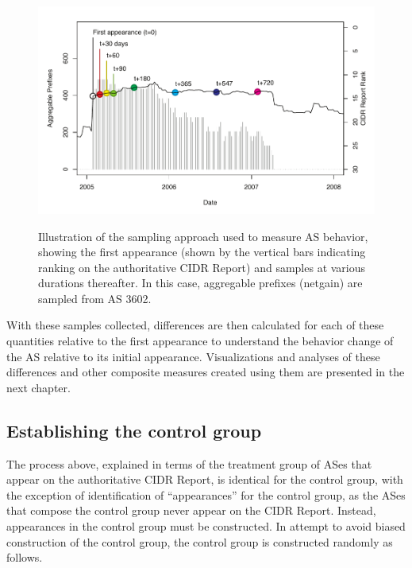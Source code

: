 \begin{figure}[h!]
\begin{centering}
    \includegraphics[width=6in]{figures/single_as.pdf}
    \vspace{-2em}\\
    \caption[Illustration of the sampling approach used to measure AS
    behavior]{Illustration of the sampling approach used to measure AS
    behavior, showing the first appearance (shown by the vertical bars
    indicating ranking on the authoritative CIDR Report) and samples at various
    durations thereafter. In this case, aggregable prefixes (netgain) are
    sampled from AS 3602.}
    \label{fig:sample_ex}
\end{centering}
\end{figure}

With these samples collected, differences are then calculated for each of these
quantities relative to the first appearance to understand the behavior change
of the AS relative to its initial appearance. Visualizations and analyses of
these differences and other composite measures created using them are presented
in the next chapter.

\subsection{Establishing the control group}

The process above, explained in terms of the treatment group of ASes that
appear on the authoritative CIDR Report, is identical for the control group,
with the exception of identification of ``appearances'' for the control group,
as the ASes that compose the control group never appear on the CIDR Report.
Instead, appearances in the control group must be constructed. In attempt to
avoid biased construction of the control group, the control group is
constructed randomly as follows.

